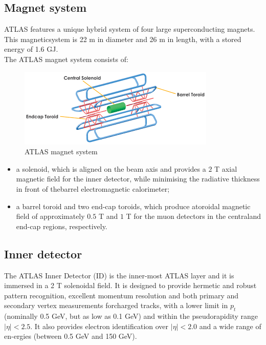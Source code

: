 \documentclass[a4paper, oneside]{book}
\begin{document}
			\subsection{Magnet system}
			\cite{ATLAS config}ATLAS features a unique hybrid system of four large superconducting magnets.  This magneticsystem is 22 m in diameter and 26 m in length, with a stored energy of 1.6 GJ. \\
			The  ATLAS  magnet  system consists of:
			\begin{figure}
				\centering
				\includegraphics[width=0.5\textheight]{tesi_images/magnet_system_atlas.png}
				\caption{ATLAS magnet system}
			\end{figure}
			\begin{itemize}
				\item a solenoid, which is aligned on the beam axis and provides a $2$ T axial magnetic field for the inner detector,  while minimising the radiative thickness in front of thebarrel electromagnetic calorimeter;
				\item a  barrel  toroid and  two  end-cap  toroids, which  produce  atoroidal magnetic field of approximately $0.5$ T and $1$ T for the muon detectors in the centraland end-cap regions, respectively.
			\end{itemize}
			\subsection{Inner detector}
			The ATLAS Inner Detector (ID) is the inner-most ATLAS layer and it is immersed in a 2 T solenoidal field. It is designed to provide hermetic and robust pattern recognition, excellent momentum resolution and both primary and secondary vertex measurements forcharged tracks, with a lower limit in $p_t$  (nominally 0.5 GeV, but as low as 0.1 GeV) and within the pseudorapidity range $|\eta|<2.5$. It also provides electron identification over $|\eta|<2.0$ and a wide range of en-ergies (between 0.5 GeV and 150 GeV). \cite{ATLAS config}
			
\end{document}
